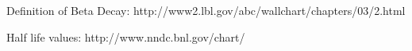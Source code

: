 \documentclass[11pt]{article}
\begin{document}
\begin{thebibliography}{9}
	 Definition of Beta Decay: http://www2.lbl.gov/abc/wallchart/chapters/03/2.html
	
	 Half life values: http://www.nndc.bnl.gov/chart/
\end{thebibliography}
\end{document}
